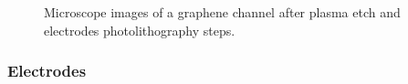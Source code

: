 \documentclass[
  letterpaper,
  DIV=11,
  numbers=noendperiod]{scrartcl}
\begin{document}
\begin{figure}
\begin{minipage}[t]{0.47\linewidth}
{{}

}

\end{minipage}%

\caption{\label{fig-microscope-graphene-channel}Microscope images of a
graphene channel after plasma etch and electrodes photolithography
steps.}

\end{figure}

\hypertarget{sec-electrodes}{%
\subsubsection{Electrodes}\label{sec-electrodes}}
\end{document}

